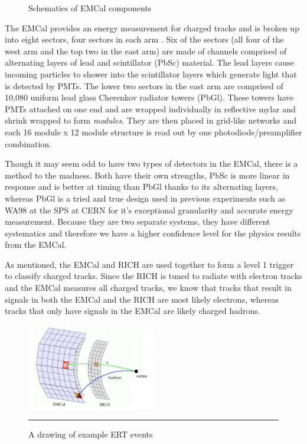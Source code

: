 \begin{figure}
\begin{subfigure}[b]{0.6\textwidth}
\end{subfigure}
\caption[Schematics of EMCal components]{Schematics of EMCal components}
\label{fig:EMCalcomponents}
\end{figure}
\dsp

The EMCal provides an energy measurement for charged tracks and is broken up into eight sectors, four sectors in each arm \citep{EMCfocus}. Six of the sectors (all four of the west arm and the top two in the east arm) are made of channels comprised of alternating layers of lead and scintillator (PbSc) material. The lead layers cause incoming particles to shower into the scintillator layers which generate light that is detected by PMTs. The lower two sectors in the east arm are comprised of 10,080 uniform lead glass Cherenkov radiator towers (PbGl). These towers have PMTs attached on one end and are wrapped individually in reflective mylar and shrink wrapped to form \textit{modules}. They are then placed in grid-like networks and each 16 module x 12 module structure is read out by one photodiode/preamplifier combination. 

Though it may seem odd to have two types of detectors in the EMCal, there is a method to the madness. Both have their own strengths, PbSc is more linear in response and is better at timing than PbGl thanks to its alternating layers, whereas PbGl is a tried and true design used in previous experiments such as WA98 at the SPS at CERN for it's exceptional granularity and accurate energy measurement. Because they are two separate systems, they have different systematics and therefore we have a higher confidence level for the physics results from the EMCal. 

As mentioned, the EMCal and RICH are used together to form a level 1 trigger to classify charged tracks. Since the RICH is tuned to radiate with electron tracks and the EMCal measures all charged tracks, we know that tracks that result in signals in both the EMCal and the RICH are most likely electrons, whereas tracks that only have signals in the EMCal are likely charged hadrons.

\begin{figure}[h!]
  \centering
    \includegraphics[width=0.5\textwidth]{Figures/ERT.jpg}
    \rule{35em}{0.5pt}
  \caption[A drawing of example ERT events]{A drawing of example ERT events}
  \label{fig:ERT}
\end{figure}

